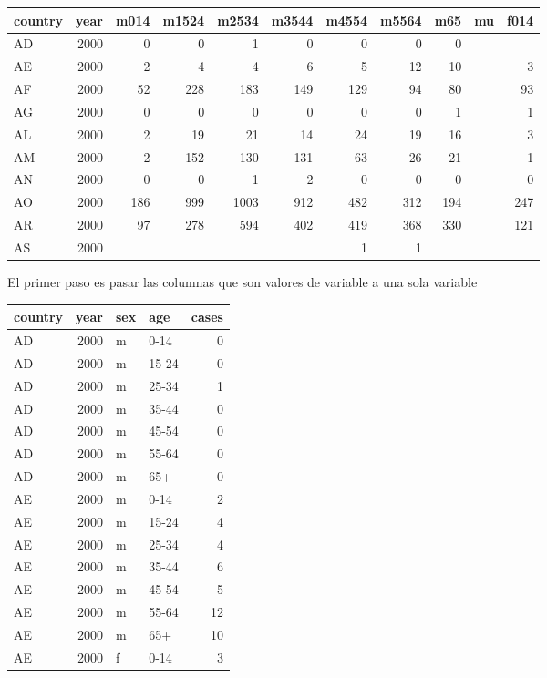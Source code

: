 \documentclass[]{article}
\begin{document}
\begin{table}[ht]
\centering
\begin{tabular}{lrrrrrrrrrr}
  \hline
country & year & m014 & m1524 & m2534 & m3544 & m4554 & m5564 & m65 & mu & f014 \\ 
  \hline
AD & 2000 &   0 &   0 &   1 &   0 &   0 &   0 &   0 &  &  \\ 
  AE & 2000 &   2 &   4 &   4 &   6 &   5 &  12 &  10 &  &   3 \\ 
  AF & 2000 &  52 & 228 & 183 & 149 & 129 &  94 &  80 &  &  93 \\ 
  AG & 2000 &   0 &   0 &   0 &   0 &   0 &   0 &   1 &  &   1 \\ 
  AL & 2000 &   2 &  19 &  21 &  14 &  24 &  19 &  16 &  &   3 \\ 
  AM & 2000 &   2 & 152 & 130 & 131 &  63 &  26 &  21 &  &   1 \\ 
  AN & 2000 &   0 &   0 &   1 &   2 &   0 &   0 &   0 &  &   0 \\ 
  AO & 2000 & 186 & 999 & 1003 & 912 & 482 & 312 & 194 &  & 247 \\ 
  AR & 2000 &  97 & 278 & 594 & 402 & 419 & 368 & 330 &  & 121 \\ 
  AS & 2000 &  &  &  &  &   1 &   1 &  &  &  \\ 
   \hline
\end{tabular}
\end{table}

El primer paso es pasar las columnas que son valores de variable a una
sola variable

\begin{table}[ht]
\centering
\begin{tabular}{lrllr}
  \hline
country & year & sex & age & cases \\ 
  \hline
AD & 2000 & m & 0-14 &   0 \\ 
  AD & 2000 & m & 15-24 &   0 \\ 
  AD & 2000 & m & 25-34 &   1 \\ 
  AD & 2000 & m & 35-44 &   0 \\ 
  AD & 2000 & m & 45-54 &   0 \\ 
  AD & 2000 & m & 55-64 &   0 \\ 
  AD & 2000 & m & 65+ &   0 \\ 
  AE & 2000 & m & 0-14 &   2 \\ 
  AE & 2000 & m & 15-24 &   4 \\ 
  AE & 2000 & m & 25-34 &   4 \\ 
  AE & 2000 & m & 35-44 &   6 \\ 
  AE & 2000 & m & 45-54 &   5 \\ 
  AE & 2000 & m & 55-64 &  12 \\ 
  AE & 2000 & m & 65+ &  10 \\ 
  AE & 2000 & f & 0-14 &   3 \\ 
   \hline
\end{tabular}
\end{table}
\end{document}
